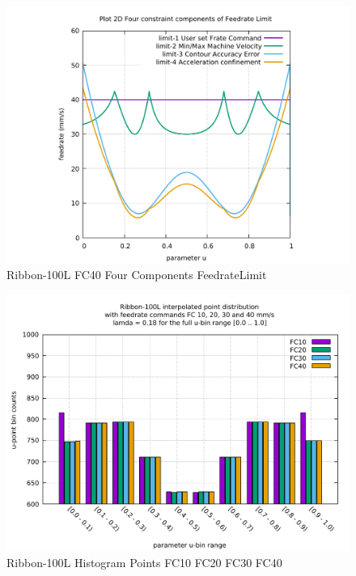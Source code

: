 \begin{figure}
	\caption     {Ribbon-100L FC40 Four Components FeedrateLimit}
	\label{34-img-Ribbon-100L-FC40-Four-Components-FeedrateLimit.pdf}
\includegraphics[width=1.00\textwidth]{Chap4/appendix/app-Ribbon-100L/plots/34-img-Ribbon-100L-FC40-Four-Components-FeedrateLimit.pdf}
\end{figure}


\clearpage
\pagebreak

\begin{figure}
	\centering
	\caption     {Ribbon-100L Histogram Points FC10 FC20 FC30 FC40}
	\label{35-img-Ribbon-100L-Histogram-Points-FC10-FC20-FC30-FC40.pdf}
\includegraphics[width=1.00\textwidth]{Chap4/appendix/app-Ribbon-100L/plots/35-img-Ribbon-100L-Histogram-Points-FC10-FC20-FC30-FC40.pdf} 
\end{figure}


